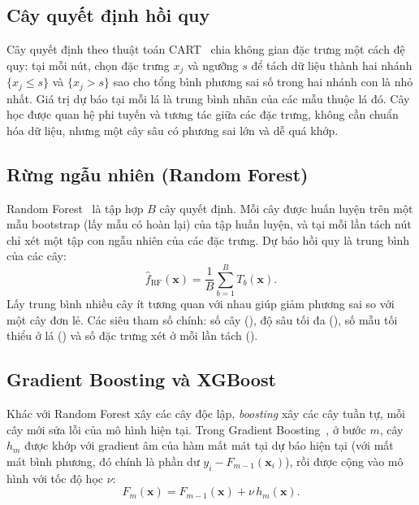 \documentclass[../main.tex]{subfiles}
\begin{document}
\subsection{Cây quyết định hồi quy}
Cây quyết định theo thuật toán CART~\cite{breiman1984classification} chia không gian đặc trưng một cách đệ quy: tại mỗi nút, chọn đặc trưng $x_j$ và ngưỡng $s$ để tách dữ liệu thành hai nhánh $\{x_j \le s\}$ và $\{x_j > s\}$ sao cho tổng bình phương sai số trong hai nhánh con là nhỏ nhất. Giá trị dự báo tại mỗi lá là trung bình nhãn của các mẫu thuộc lá đó. Cây học được quan hệ phi tuyến và tương tác giữa các đặc trưng, không cần chuẩn hóa dữ liệu, nhưng một cây sâu có phương sai lớn và dễ quá khớp.

\subsection{Rừng ngẫu nhiên (Random Forest)}
Random Forest~\cite{breiman2001random} là tập hợp $B$ cây quyết định. Mỗi cây được huấn luyện trên một mẫu bootstrap (lấy mẫu có hoàn lại) của tập huấn luyện, và tại mỗi lần tách nút chỉ xét một tập con ngẫu nhiên của các đặc trưng. Dự báo hồi quy là trung bình của các cây:
\begin{equation}
\hat{f}_{\text{RF}}(\mathbf{x}) = \frac{1}{B}\sum_{b=1}^{B} T_b(\mathbf{x}).
\end{equation}
Lấy trung bình nhiều cây ít tương quan với nhau giúp giảm phương sai so với một cây đơn lẻ. Các siêu tham số chính: số cây (), độ sâu tối đa (), số mẫu tối thiểu ở lá () và số đặc trưng xét ở mỗi lần tách ().

\subsection{Gradient Boosting và XGBoost}
Khác với Random Forest xây các cây độc lập, \textit{boosting} xây các cây tuần tự, mỗi cây mới sửa lỗi của mô hình hiện tại. Trong Gradient Boosting~\cite{friedman2001greedy}, ở bước $m$, cây $h_m$ được khớp với gradient âm của hàm mất mát tại dự báo hiện tại (với mất mát bình phương, đó chính là phần dư $y_i - F_{m-1}(\mathbf{x}_i)$), rồi được cộng vào mô hình với tốc độ học $\nu$:
\begin{equation}
F_m(\mathbf{x}) = F_{m-1}(\mathbf{x}) + \nu\, h_m(\mathbf{x}).
\end{equation}
\end{document}
